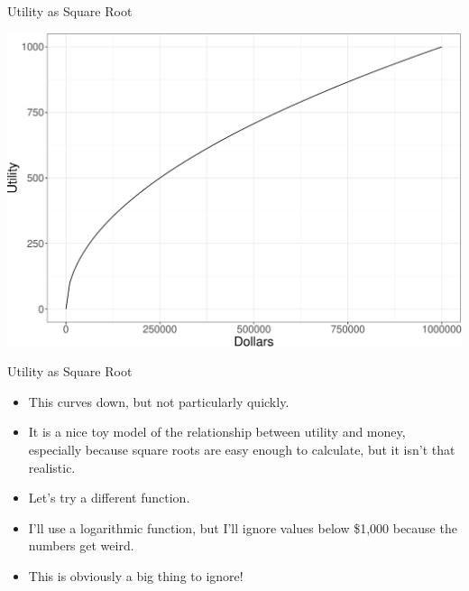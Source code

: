 \documentclass[
  ignorenonframetext,
]{beamer}
\providecommand{\tightlist}{%
  \setlength{\itemsep}{0pt}\setlength{\parskip}{0pt}}
\renewcommand{\,}{\text{, }}
\begin{document}
\begin{frame}{Utility as Square Root}
\protect\hypertarget{utility-as-square-root}{}
\begin{center}


\includegraphics[width=0.9\linewidth]{09_5_files/figure-beamer/unnamed-chunk-1-1} 

\end{center}
\end{frame}

\begin{frame}{Utility as Square Root}
\protect\hypertarget{utility-as-square-root-1}{}
\begin{itemize}
\tightlist
\item
  This curves down, but not particularly quickly.
\item
  It is a nice toy model of the relationship between utility and money,
  especially because square roots are easy enough to calculate, but it
  isn't that realistic. \pause
\item
  Let's try a different function.
\item
  I'll use a logarithmic function, but I'll ignore values below \$1,000
  because the numbers get weird.
\item
  This is obviously a big thing to ignore!
\end{itemize}
\end{frame}
\end{document}
